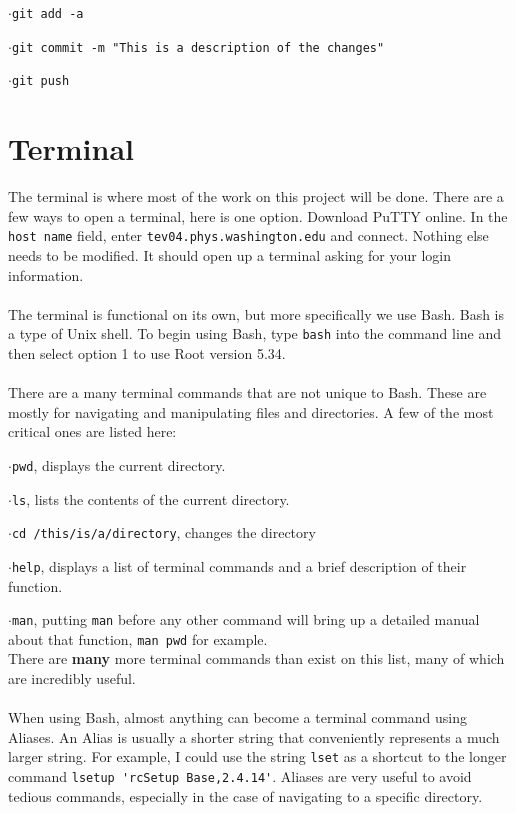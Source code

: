 \documentclass[10pt,a4paper]{report}
\begin{document}
$\cdot$\verb|git add -a|

$\cdot$\verb|git commit -m "This is a description of the changes"|

$\cdot$\verb|git push|\\


\section*{Terminal}
The terminal is where most of the work on this project will be done. There are a few ways to open a terminal, here is one option. Download PuTTY online. In the \verb|host name| field, enter \verb|tev04.phys.washington.edu| and connect. Nothing else needs to be modified. It should open up a terminal asking for your login information.\\\\
The terminal is functional on its own, but more specifically we use Bash. Bash is a type of Unix shell. To begin using Bash, type \verb|bash| into the command line and then select option 1 to use Root version 5.34.\\\\
There are a many terminal commands that are not unique to Bash. These are mostly for navigating and manipulating files and directories. A few of the most critical ones are listed here:

$\cdot$\verb|pwd|, displays the current directory.

$\cdot$\verb|ls|, lists the contents of the current directory.

$\cdot$\verb|cd /this/is/a/directory|, changes the directory

$\cdot$\verb|help|, displays a list of terminal commands and a brief description of their function.

$\cdot$\verb|man|, putting \verb|man| before any other command will bring up a detailed manual about that function, \verb|man pwd| for example.\\
There are \textbf{many} more terminal commands than exist on this list, many of which are incredibly useful.\\\\
When using Bash, almost anything can become a terminal command using Aliases. An Alias is usually a shorter string that conveniently represents a much larger string. For example, I could use the string \verb|lset| as a shortcut to the longer command \verb|lsetup 'rcSetup Base,2.4.14'|. Aliases are very useful to avoid tedious commands, especially in the case of navigating to a specific directory.
\end{document}
